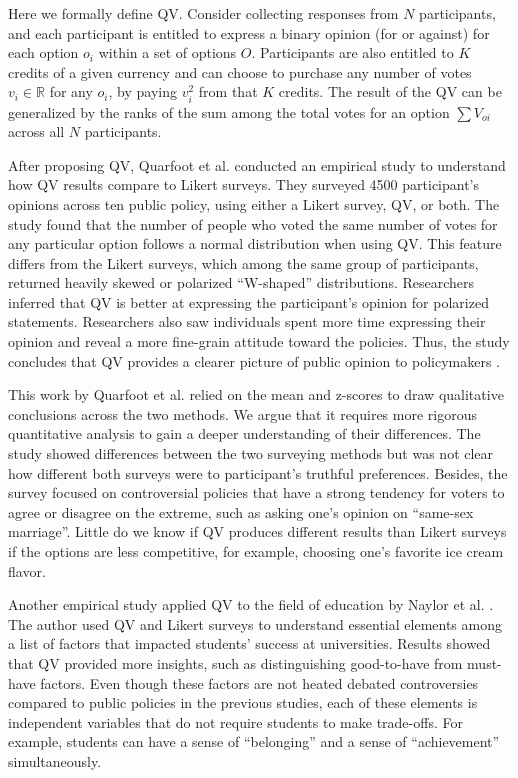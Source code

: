 Here we formally define QV. Consider collecting responses from $N$ participants, and each participant is entitled to express a binary opinion (for or against) for each option $o_i$ within a set of options $O$. Participants are also entitled to $K$ credits of a given currency and can choose to purchase any number of votes $v_i \in \mathbb{R}$ for any $o_i$, by paying $v_i^2$ from that $K$ credits. The result of the QV can be generalized by the ranks of the sum among the total votes for an option $\sum{V_{oi}}$ across all $N$ participants.\par

After proposing QV, Quarfoot et al. \cite{quarfoot2017quadratic} conducted an empirical study to understand how QV results compare to Likert surveys. They surveyed 4500 participant's opinions across ten public policy, using either a Likert survey, QV, or both. The study found that the number of people who voted the same number of votes for any particular option follows a normal distribution when using QV. This feature differs from the Likert surveys, which among the same group of participants, returned heavily skewed or polarized ``W-shaped'' distributions. Researchers inferred that QV is better at expressing the participant's opinion for polarized statements. Researchers also saw individuals spent more time expressing their opinion and reveal a more fine-grain attitude toward the policies. Thus, the study concludes that QV provides a clearer picture of public opinion to policymakers \cite{quarfoot2017quadratic}.

This work by Quarfoot et al. relied on the mean and z-scores to draw qualitative conclusions across the two methods. We argue that it requires more rigorous quantitative analysis to gain a deeper understanding of their differences. The study showed differences between the two surveying methods but was not clear how different both surveys were to participant's truthful preferences. Besides, the survey focused on controversial policies that have a strong tendency for voters to agree or disagree on the extreme, such as asking one's opinion on ``same-sex marriage''. Little do we know if QV produces different results than Likert surveys if the options are less competitive, for example, choosing one's favorite ice cream flavor.\par

Another empirical study applied QV to the field of education by Naylor et al. \cite{naylor2017first}. The author used QV and Likert surveys to understand essential elements among a list of factors that impacted students' success at universities. Results showed that QV provided more insights, such as distinguishing good-to-have from must-have factors. Even though these factors are not heated debated controversies compared to public policies in the previous studies, each of these elements is independent variables that do not require students to make trade-offs. For example, students can have a sense of ``belonging'' and a sense of ``achievement'' simultaneously.

